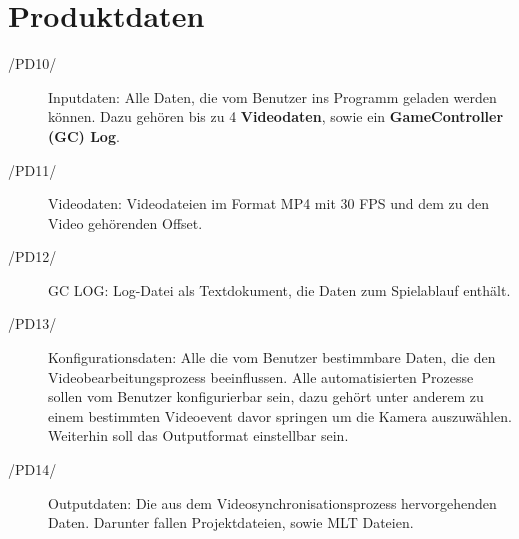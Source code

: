 	\section{Produktdaten}
		\begin{description}
			\item [/PD10/] Inputdaten: Alle Daten, die vom Benutzer ins Programm geladen werden können. Dazu gehören bis zu 4 \textbf{Videodaten}, sowie ein \textbf{GameController (GC) Log}.
			\item [/PD11/] Videodaten: Videodateien im Format MP4 mit 30 FPS und dem zu den Video gehörenden Offset.
			\item [/PD12/] GC LOG: Log-Datei als Textdokument, die Daten zum Spielablauf enthält.
			\item [/PD13/] Konfigurationsdaten: Alle die vom Benutzer bestimmbare Daten, die den Videobearbeitungsprozess beeinflussen. Alle automatisierten Prozesse sollen vom Benutzer konfigurierbar sein, dazu gehört unter anderem zu einem bestimmten Videoevent davor springen um die Kamera auszuwählen. Weiterhin soll das Outputformat einstellbar sein.
			\item [/PD14/] Outputdaten: Die aus dem Videosynchronisationsprozess hervorgehenden Daten. Darunter fallen Projektdateien, sowie MLT Dateien.
		\end{description}